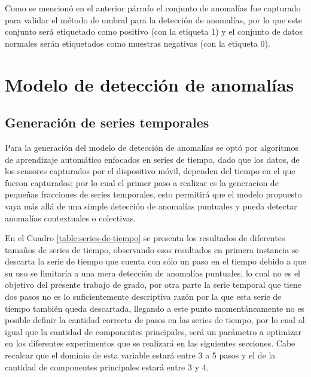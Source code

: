 \vspace{5mm} %

Como se mencion\'{o} en el anterior p\'{a}rrafo el conjunto de anomal\'{i}as fue capturado para validar el m\'{e}todo de umbral para la detecci\'{o}n de anomal\'{i}as, por lo que este conjunto ser\'{a} etiquetado como positivo (con la etiqueta 1) y el conjunto de datos normales ser\'{a}n etiquetados como muestras negativas (con la etiqueta 0).

\section{Modelo de detecci\'{o}n de anomal\'{i}as}

\subsection{Generaci\'{o}n de series temporales}

Para la generaci\'{o}n del modelo de detecci\'{o}n de anomal\'{i}as se opt\'{o} por algoritmos de aprendizaje autom\'{a}tico enfocados en series de tiempo, dado que los datos, de los sensores capturados por el dispositivo m\'{o}vil, dependen del tiempo en el que fueron capturados; por lo cual el primer paso a realizar es la generacion de peque\~{n}as fracciones de series temporales, esto permitir\'{a} que el modelo propuesto vaya m\'{a}s all\'{a} de una simple detecci\'{o}n de anomal\'{i}as puntuales y pueda detectar anomal\'{i}as contextuales o colectivas.

\vspace{5mm} %

En el Cuadro \ref{table:series-de-tiempo} se presenta los resultados de diferentes tama\~{n}os de series de tiempo, observando esos resultados en primera instancia se descarta la serie de tiempo que cuenta con s\'{o}lo un paso en el tiempo debido a que su uso se limitar\'{i}a a una mera detecci\'{o}n de anomal\'{i}as puntuales, lo cual no es el objetivo del presente trabajo de grado, por otra parte la serie temporal que tiene dos pasos no es lo suficientemente descriptiva raz\'{o}n por la que esta serie de tiempo tambi\'{e}n queda descartada, llegando a este punto moment\'{a}neamente no es posible definir la cantidad correcta de pasos en las series de tiempo, por lo cual al igual que la cantidad de componentes principales, ser\'{a} un par\'{a}metro a optimizar en los diferentes experimentos que se realizar\'{a} en las siguientes secciones. Cabe recalcar que el dominio de esta variable estar\'{a} entre 3 a 5 pasos y el de la cantidad de componentes principales estar\'{a} entre 3 y 4.


